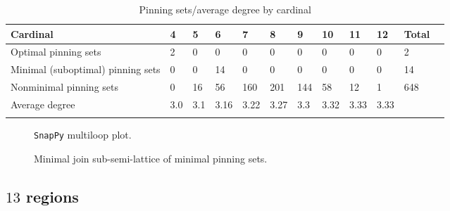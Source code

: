 \documentclass{article}%
\begin{document}
\begin{table}[ht]
	\caption{Pinning sets/average degree by cardinal}
	\centering
	\renewcommand{\arraystretch}{1.5}
	\begin{tabularx}{\textwidth}{lXXXXXXXXXXX}
		\toprule
			Cardinal & 4 & 5 & 6 & 7 & 8 & 9 & 10 & 11 & 12 & Total\\
			\hline
			Optimal pinning sets & 2 & 0 & 0 & 0 & 0 & 0 & 0 & 0 & 0 & 2 \\
			Minimal (suboptimal) pinning sets & 0 & 0 & 14 & 0 & 0 & 0 & 0 & 0 & 0 & 14 \\
			Nonminimal pinning sets & 0 & 16 & 56 & 160 & 201 & 144 & 58 & 12 & 1 & 648 \\
			Average degree & 3.0 & 3.1 & 3.16 & 3.22 & 3.27 & 3.3 & 3.32 & 3.33 & 3.33 &  \\
		\bottomrule \\ 
	\end{tabularx}
\end{table}

\begin{multicols}{2}
\begin{figure}[H]
\centering

\caption{\texttt{SnapPy} multiloop plot.}
\label{fig:tex/img/[[6, 12, 1, 7], [7, 13, 8, 16], [5, 15, 6, 16], [11, 14, 12, 15], [1, 14, 2, 13], [8, 17, 9, 20], [4, 19, 5, 20], [10, 18, 11, 19], [2, 18, 3, 17], [9, 3, 10, 4]].svg}
\end{figure}
\columnbreak

\begin{figure}[H]
\centering
\scalebox{0.8}{}
\caption{Minimal join sub-semi-lattice of minimal pinning sets.}
\label{fig:tex/img/[[6, 12, 1, 7], [7, 13, 8, 16], [5, 15, 6, 16], [11, 14, 12, 15], [1, 14, 2, 13], [8, 17, 9, 20], [4, 19, 5, 20], [10, 18, 11, 19], [2, 18, 3, 17], [9, 3, 10, 4]].pgf}
\end{figure}
\end{multicols}

\newpage

\subsection{$13$ regions}
\end{document}
